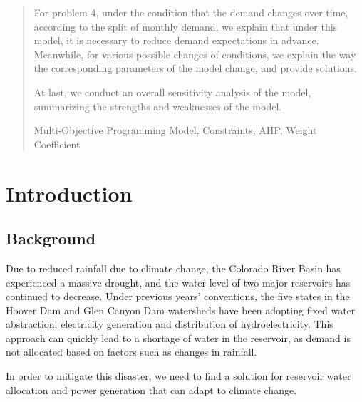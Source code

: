 \documentclass{mcmthesis}
\begin{document}
\begin{abstract}
For problem 4, under the condition that the demand changes over time, according to the split of monthly demand, we explain that under this model, it is necessary to reduce demand expectations in advance. Meanwhile, for various possible changes of conditions, we explain the way the corresponding parameters of the model change, and provide solutions. 

At last, we conduct an overall sensitivity analysis of the model, summarizing the strengths and weaknesses of the model.
\begin{keywords}
Multi-Objective Programming Model, Constraints, AHP, Weight Coefficient 
\end{keywords}
\end{abstract}
\maketitle
\newpage                                                          %
\begin{adjustwidth}{-1cm}{0cm}

\setcounter{tocdepth}{3}
\thispagestyle{empty}
\tableofcontents                                                  %

\end{adjustwidth}


\newpage

\pagestyle{fancy}

\setcounter{page}{1}
\section{Introduction}
\subsection{Background}
Due to reduced rainfall due to climate change, the Colorado River Basin has experienced a massive drought, and the water level of two major reservoirs has continued to decrease. Under previous years' conventions, the five states in the Hoover Dam and Glen Canyon Dam watersheds have been adopting fixed water abstraction, electricity generation and distribution of hydroelectricity. This approach can quickly lead to a shortage of water in the reservoir, as demand is not allocated based on factors such as changes in rainfall.

In order to mitigate this disaster, we need to find a solution for reservoir water allocation and power generation that can adapt to climate change. 
\end{document}
